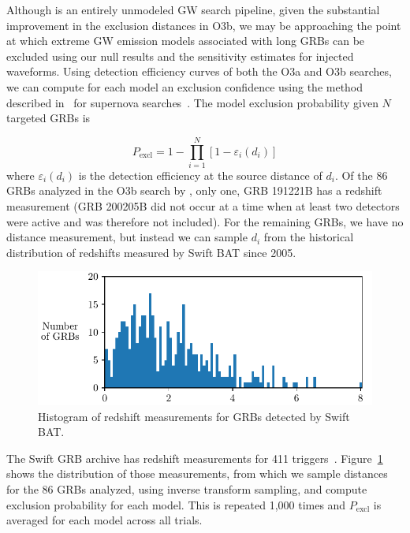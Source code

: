 Although \xpip is an entirely unmodeled \ac{GW} search pipeline, given the substantial improvement in the exclusion distances in O3b, we may be approaching the point at which extreme GW emission models associated with long GRBs can be excluded using our null results and the sensitivity estimates for injected waveforms.
Using detection efficiency curves of both the O3a and O3b searches, we can compute for each model an exclusion confidence using the method described in~\citet{Kalmus_2013} for supernova searches~\citep{burst_o2}.
The model exclusion probability given $N$ targeted GRBs is

\begin{equation}
	P_{\text{excl}} = 1 - \prod_{i=1}^N \left[ 1 - \varepsilon_i(d_i) \right]
\end{equation}
where $\varepsilon_i(d_i)$ is the detection efficiency at the source distance of $d_i$.
Of the 86 GRBs analyzed in the O3b search by \xpip, only one, GRB 191221B has a redshift measurement (GRB 200205B did not occur at a time when at least two detectors were active and was therefore not included).
For the remaining GRBs, we have no distance measurement, but instead we can sample $d_i$ from the historical distribution of redshifts measured by Swift \ac{BAT} since 2005.

\begin{figure}[h]
  \centering
  \includegraphics{figures/grb/redshifts.pdf}
  \caption{Histogram of redshift measurements for GRBs detected by Swift BAT.}
  \label{fig:grb-o3b-redshifts}
\end{figure}

The Swift GRB archive has redshift measurements for 411 triggers~\citep{swift_archive}.
Figure~\ref{fig:grb-o3b-redshifts} shows the distribution of those measurements, from which we sample distances for the 86 GRBs analyzed, using inverse transform sampling, and compute exclusion probability for each model.
This is repeated 1,000 times and $P_{\text{excl}}$ is averaged for each model across all trials.

